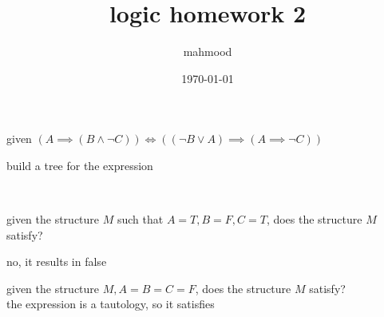 \documentclass[a4paper,12pt]{article}
\author{mahmood}
\date{\today}
\title{logic homework 2}
\begin{document}
\maketitle
\begin{question}
given \((A \implies (B \land \lnot C)) \iff ((\lnot B \lor A) \implies (A \implies \lnot C))\)\\
\begin{subquestion}
build a tree for the expression\\
\begin{answer}
\\
\end{answer}
\end{subquestion}
\begin{subquestion}
given the structure \(M\) such that \(A=T,B=F,C=T\), does the structure \(M\) satisfy?\\
\begin{answer}
no, it results in false\\
\end{answer}
\end{subquestion}
\begin{subquestion}
given the structure \(M,A=B=C=F\), does the structure \(M\) satisfy?\\
the expression is a tautology, so it satisfies\\
\end{subquestion}
\end{question}
\end{document}
